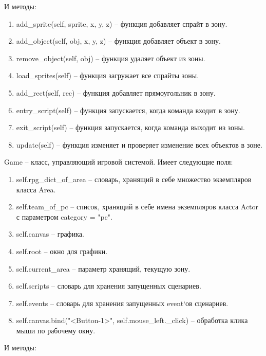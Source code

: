 		И методы:
		\begin{enumerate}
			\item add\_sprite(self, sprite, x, y, z) -- функция добавляет спрайт в зону.
			\item add\_object(self, obj, x, y, z) -- функция добавляет объект в зону.
			\item remove\_object(self, obj) -- функция удаляет объект из зоны.
			\item load\_sprites(self) -- функция загружает все спрайты зоны.
			\item add\_rect(self, rec) -- функция добавляет прямоугольник в зону.
			\item entry\_script(self) -- функция запускается, когда команда входит в зону.
			\item exit\_script(self) -- функция запускается, когда команда выходит из зоны.
			\item update(self) -- функция изменяет и проверяет изменение всех объектов в зоне.
		\end{enumerate}
	Game -- класс, управляющий игровой системой. Имеет следующие поля:
		\begin{enumerate}
			\item self.rpg\_dict\_of\_area -- словарь, хранящий в себе множество экземпляров класса Area.
			\item self.team\_of\_pc -- список, хранящий в себе имена экземпляров класса Actor с параметром category = "pc".
			\item self.canvas -- графика.
			\item self.root -- окно для графики.
			\item self.current\_area -- параметр хранящий, текущую зону.
			\item self.scripts -- словарь для хранения запущенных сценариев.
			\item self.events -- словарь для хранения запущенных event`ов сценариев.
			\item self.canvas.bind("<Button-1>", self.mouse\_left.\_click) -- обработка клика мыши по рабочему окну.
		\end{enumerate}
		И методы:

